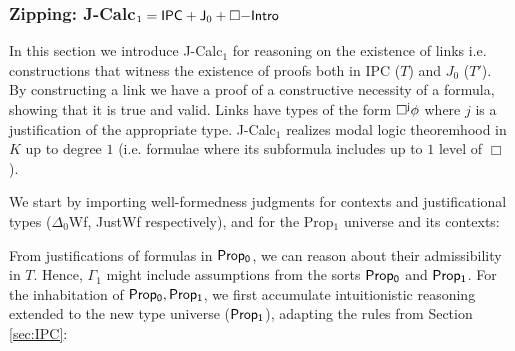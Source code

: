 \documentclass[11pt]{entcs}
\newcommand{\TurnTT}[2]
	{ \Delta_0;{#1}\vdash_{\sf JC_1}  {#2}}
\newcommand{\Turnj}[1]
	{ \Delta_0\vdash_{\sf J_0}  {#1}}
\begin{document}
\subsubsection{Zipping: {\sf J-Calc}$_1={\sf IPC}+ {\sf J}_0+\Box{\sf-Intro}$}\label{sec:jcalc1}
In this section we introduce {\sf J-Calc$_1$} for reasoning on the existence of  links i.e. constructions that witness the existence of proofs both in {\sf IPC} ($T$) and {\sf $J_0$} ($T'$). By constructing a link we have a proof of a constructive necessity of a formula, showing that it is true and valid. Links have types of the form ${\sf\Box^{j}\phi}$ where $j$ is a justification of the appropriate type. {\sf J-Calc$_1$} realizes modal logic theoremhood in $K$ up to degree $1$ (i.e. formulae where its subformula includes up to $1$ level of $\Box$). 

We start by importing well-formedness judgments for contexts and justificational types ($\Delta_0$Wf, JustWf respectively), and for the Prop$_{1}$ universe and its contexts: 

\bigskip

From justifications of formulas in ${\sf Prop_0}$, we can reason about their admissibility in $T$. Hence, $\Gamma_1$ might include assumptions from the sorts ${\sf Prop_0}$ and ${\sf Prop_1}$. For the inhabitation of ${\sf Prop_0, Prop_1}$, we first accumulate intuitionistic reasoning extended to the new type universe (${\sf Prop_1}$), adapting the rules from Section \ref{sec:IPC}:
\bigskip
\end{document}
